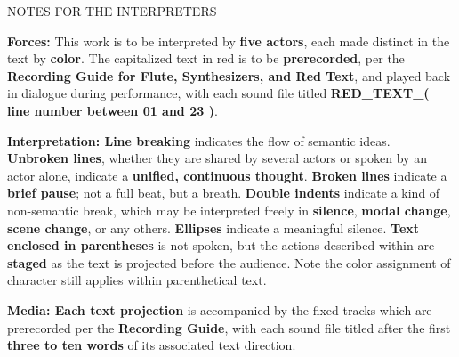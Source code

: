 \documentclass[12pt]{article}
\newcommand*\circled[1]{\tikz[baseline=(char.base)]{
            \node[shape=circle,draw,inner sep=1pt] (char) {#1};}}
\begin{document}
\vspace*{18\baselineskip}

\begingroup
\begin{center}
\huge NOTES FOR THE INTERPRETERS
\end{center}
\endgroup

\begingroup
\textbf{Forces: \circled{1}} This work is to be interpreted by \textbf{five actors}, each made distinct in the text by \textbf{color}. The capitalized text in red is to be \textbf{prerecorded}, per the \textbf{Recording Guide for Flute, Synthesizers, and Red Text}, and played back in dialogue during performance, with each sound file titled \textbf{RED\_TEXT\_( line number between 01 and 23 )}.
\endgroup

\begingroup
\textbf{Interpretation: \circled{1} Line breaking} indicates the flow of semantic ideas. \textbf{Unbroken lines}, whether they are shared by several actors or spoken by an actor alone, indicate a \textbf{unified, continuous thought}. \textbf{Broken lines} indicate a \textbf{brief pause}; not a full beat, but a breath. \textbf{Double indents} indicate a kind of non-semantic break, which may be interpreted freely in \textbf{silence}, \textbf{modal change}, \textbf{scene change}, or any others. \textbf{Ellipses} indicate a meaningful silence. \textbf{\circled{2} Text enclosed in parentheses} is not spoken, but the actions described within are \textbf{staged} as the text is projected before the audience. Note the color assignment of character still applies within parenthetical text. 
\endgroup

\begingroup
\textbf{Media: \circled{1} Each text projection} is accompanied by the fixed tracks which are prerecorded per the \textbf{Recording Guide}, with each sound file titled after the first \textbf{three to ten words} of its associated text direction.
\endgroup
\end{document}
